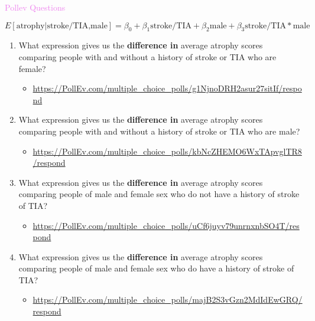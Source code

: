 \documentclass[10pt,t]{beamer}
\begin{document}
\begin{frame}{\textcolor{violet}{Pollev Questions}}
	
	\vspace{-13 mm}
	\small
	\[E[\text{atrophy}|\text{stroke/TIA,male}]=\beta_0+\beta_1\text{stroke/TIA}+\beta_2\text{male}+{\beta_3}\text{stroke/TIA}*\text{male}\]
	
	\normalsize
	\begin{enumerate}
		\item What expression gives us the \textbf{difference in} average atrophy scores comparing people with and without a history of stroke or TIA who are female?
		\begin{itemize}
	
			\item{\tiny\url{https://PollEv.com/multiple_choice_polls/g1NjnoDRH2asur27sitIf/respond}}\pause
		\end{itemize}
	
		\item What expression gives us the \textbf{difference in} average atrophy scores comparing people with and without a history of stroke or TIA who are male?
		\begin{itemize}
			
			\item{\tiny\url{https://PollEv.com/multiple_choice_polls/kbNcZHEMO6WxTApvglTR8/respond}}\pause
		\end{itemize}

		\item What expression gives us the \textbf{difference in} average atrophy scores comparing people of male and female sex who do not have a history of stroke of TIA?
		\begin{itemize}
			
			\item{\tiny\url{https://PollEv.com/multiple_choice_polls/uCf6juyv79unrnxnbSO4T/respond}}\pause
		\end{itemize}
	
		\item What expression gives us the \textbf{difference in} average atrophy scores comparing people of male and female sex who do have a history of stroke of TIA?
		\begin{itemize}
			\smallskip
			\item{\tiny\url{https://PollEv.com/multiple_choice_polls/majB2S3vGzn2MdIdEwGRQ/respond}}\pause
		\end{itemize}
	\end{enumerate}
	
	
\end{frame}
\end{document}
